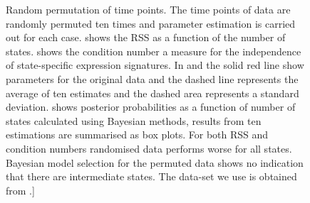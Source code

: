 \begin{figure}
  \centering
  \caption{Random permutation of time points. The time points of data are randomly permuted ten times and parameter estimation is carried out for each case.  shows the RSS as a function of the number of states.  shows the condition number a measure for the independence of state-specific expression signatures. In  and  the solid red line show parameters for the original data and the dashed line represents the average of ten estimates and the dashed area represents a standard deviation.  shows posterior probabilities as a function of number of states calculated using Bayesian methods, results from ten estimations are summarised as box plots. For both RSS and condition numbers randomised data performs worse for all states. Bayesian model selection for the permuted data shows no indication that there are intermediate states. The data-set we use is obtained from \citep{SamavarchiTehrani:2010cp}.]}
\label{fig:permutation-repro}
\end{figure}

